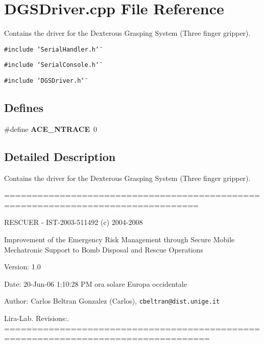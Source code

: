 \section{DGSDriver.cpp File Reference}
\label{DGSDriver_8cpp}
Contains the driver for the Dexterous Grasping System (Three finger gripper).  


{\tt \#include \char`\"{}Serial\-Handler.h\char`\"{}}\par
{\tt \#include \char`\"{}Serial\-Console.h\char`\"{}}\par
{\tt \#include \char`\"{}DGSDriver.h\char`\"{}}\par
\subsection*{Defines}
\begin{CompactItemize}
\item 
\#define {\bf ACE\_\-NTRACE}\ 0\label{DGSDriver_8cpp_a0}

\end{CompactItemize}


\subsection{Detailed Description}
Contains the driver for the Dexterous Grasping System (Three finger gripper). 

=================================================================================

RESCUER - IST-2003-511492 (c) 2004-2008

Improvement of the Emergency Risk Management through Secure Mobile Mechatronic Support to Bomb Disposal and Rescue Operations

\begin{Desc}
\item[Version:]1.0 \end{Desc}
\begin{Desc}
\item[Date:]20-Jun-06 1:10:28 PM ora solare Europa occidentale \end{Desc}
\begin{Desc}
\item[Author:]Carlos Beltran Gonzalez (Carlos), {\tt cbeltran@dist.unige.it} 

Lira-Lab. Revisions:. ===================================================================================\end{Desc}
